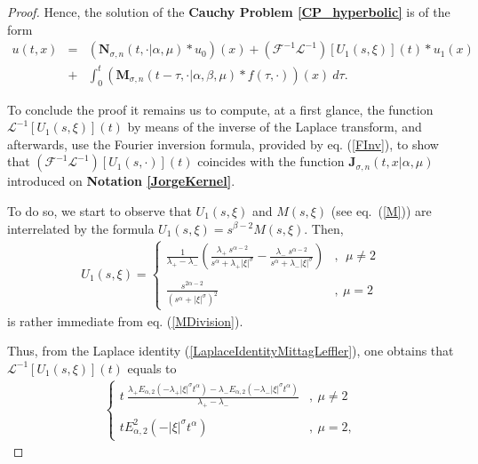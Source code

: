 \documentclass{amsart}
\theoremstyle{definition}
\theoremstyle{remark}
\numberwithin{equation}{section}
\begin{document}
\begin{proof}
			Hence, the solution of the {\bf Cauchy Problem \ref{CP_hyperbolic}} is of the form
			\begin{eqnarray*}
				u(t,x)&=&({\bm N}_{\sigma,n}(t,\cdot|\alpha,\mu)*u_0)(x)+(\mathcal{F}^{-1}\mathcal{L}^{-1})[U_1(s,\xi)](t)*u_1(x) \\
				&+&\int_{0}^t \left({\bm M}_{\sigma,n}(t-\tau,\cdot|\alpha,\beta,\mu)*f(\tau,\cdot)\right)(x)~d\tau.
			\end{eqnarray*}
			
			To conclude the proof it remains us to compute, at a first glance, the function $\mathcal{L}^{-1}[U_1(s,\xi)](t)$ by means of the inverse of the Laplace transform, and afterwards, use the Fourier inversion formula, provided by eq. (\ref{FInv}), to show that $(\mathcal{F}^{-1}\mathcal{L}^{-1})[U_1(s,\cdot)](t)$ coincides with the function ${\bm J}_{\sigma,n}(t,x|\alpha,\mu)$ introduced on {\bf Notation \ref{JorgeKernel}}.
			
			
			To do so, we start to observe that $U_1(s,\xi)$ and $M(s,\xi)$ (see eq.~(\ref{M})) are interrelated by the formula $U_1(s,\xi)=s^{\beta-2}M(s,\xi)$. Then,
			\begin{eqnarray}
				\label{U1Division}
				U_1(s,\xi)=\begin{cases}
					\displaystyle \frac{1}{\lambda_+-\lambda_-}\left(\frac{\lambda_+~s^{\alpha-2}}{s^\alpha+\lambda_+|\xi|^\sigma}-\frac{\lambda_-~s^{\alpha-2}}{s^\alpha+\lambda_-|\xi|^\sigma}\right)&,~ ~\mu\neq 2 \\ \ \\
					\displaystyle\frac{s^{2\alpha-2}}{(s^\alpha+|\xi|^\sigma)^2}&,~\mu= 2
				\end{cases}
			\end{eqnarray}
			is rather immediate from eq. (\ref{MDivision}). 
			
			Thus, from the Laplace identity (\ref{LaplaceIdentityMittagLeffler}), one obtains that $\mathcal{L}^{-1}[U_1(s,\xi)](t)$ equals to
			\begin{eqnarray*}
					\begin{cases}
						\displaystyle 	t~\frac{\lambda_+E_{\alpha,2}(-\lambda_+|\xi|^\sigma t^\alpha)-\lambda_-E_{\alpha,2}(-\lambda_-|\xi|^\sigma t^\alpha)}{\lambda_+-\lambda_-}&,~\mu\neq 2 \\ \ \\
						\displaystyle tE_{\alpha,2}^2(-|\xi|^\sigma t^\alpha)&,~\mu= 2,
					\end{cases}
			\end{eqnarray*}
			

\end{proof}
\end{document}
